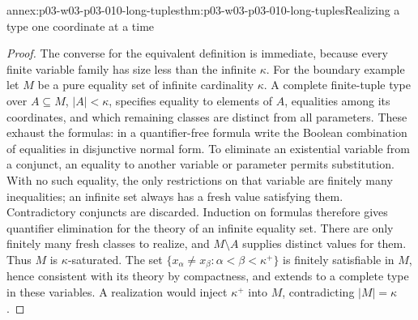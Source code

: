 \begin{annexitem}{annex:p03-w03-p03-010-long-tuples}{thm:p03-w03-p03-010-long-tuples}{Realizing a type one coordinate at a time}
\begin{proof}
The converse for the equivalent definition is immediate, because every
finite variable family has size less than the infinite \(\kappa\).
For the boundary example let \(M\) be a pure equality set of infinite
cardinality \(\kappa\). A complete finite-tuple type over
\(A\subseteq M\), \(|A|<\kappa\), specifies equality to elements of
\(A\), equalities among its coordinates, and which remaining classes
are distinct from all parameters. These exhaust the formulas: in a
quantifier-free formula write the Boolean combination of equalities in
disjunctive normal form. To eliminate an existential variable from a
conjunct, an equality to another variable or parameter permits
substitution. With no such equality, the only restrictions on that
variable are finitely many inequalities; an infinite set always has
a fresh value satisfying them. Contradictory conjuncts are discarded.
Induction on formulas therefore gives quantifier elimination for the
theory of an infinite equality set.
There are only finitely many fresh classes to realize, and
\(M\setminus A\) supplies distinct values for them. Thus \(M\) is
\(\kappa\)-saturated. The set
\(\{x_\alpha\neq x_\beta:\alpha<\beta<\kappa^+\}\) is finitely
satisfiable in \(M\), hence consistent with its theory by compactness,
and extends to a complete type in these variables. A realization would
inject \(\kappa^+\) into \(M\), contradicting \(|M|=\kappa\).
\end{proof}
\end{annexitem}
